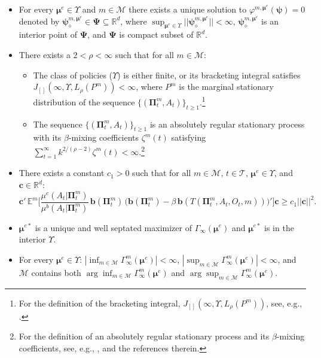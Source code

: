 \documentclass[opre,nonblindrev]{informs2}%
\newcommand{\1}{\hbox{\rm 1\kern-.35em 1}}
\newcommand{\E}{\mathbb E}
\newcommand{\MT}{\mathscr T}
\newcommand{\MM}{\mathscr M}
\newcommand{\bPi}{\boldsymbol{\Pi}}
\newcommand{\bmu}{\boldsymbol{\mu}}
\newcommand{\bpsi}{\boldsymbol{\psi}}
\newcommand{\bPsi}{\boldsymbol{\Psi}}
\newcommand{\bb}{\mathbf{b}}
\begin{document}
\begin{itemize}[leftmargin=1cm,align=left]
\item[(C1)]  For every $\bmu^e\in\Upsilon$ and $m\in\MM$ there exists a unique solution to $\varphi^{m,\bmu^e} (\bpsi)=0$ denoted by $\bpsi_\diamond^{m,\bmu^e}\in\bPsi\subseteq \mathbb R^d$, where $\sup_{\bmu^e\in\Upsilon}||\bpsi_\diamond^{m,\bmu^e}||<\infty$,  $\bpsi_\diamond^{m,\bmu^e}$  is an interior point of $\bPsi$, and $\bPsi$ is compact subset of $\mathbb R^d$.
\item[(C2)]  There exists a  $2<\rho<\infty$ such that for all $m\in\MM$:
\begin{itemize}[leftmargin=1.5cm]
\item[(C2a)] The class of policies ($\Upsilon$) is either finite, or its bracketing integral satisfies  $J_{[]}(\infty,\Upsilon, L_\rho(P^m))<\infty$, where $P^m$ is  the marginal stationary distribution of the sequence $\{(\bPi^m_t, A_t)\}_{t\geq 1}$.\footnote{For the definition of the bracketing integral, $J_{[]}(\infty,\Upsilon, L_\rho(P^m))$, see, e.g., \cite{Kosorok2008}.}
\item[(C2b)] The sequence $\{(\bPi^m_t, A_t)\}_{t\geq 1}$  is an absolutely regular stationary process with its $\beta$-mixing coefficients $\zeta^m (t)$ satisfying $\sum_{t=1}^{\infty} k^{2/(\rho-2)} \zeta^m (t)<\infty$.\footnote{For the definition of  an absolutely regular stationary process and its $\beta$-mixing coefficients, see, e.g., \cite{Dedecker2002, Kosorok2008}, and the references therein.}
\end{itemize}
\noindent\item[(C3)] There exists a constant $c_1>0$ such that for all $m\in\MM$, $t\in\MT$, $\bmu^e\in\Upsilon$, and  $\mathbf{c}\in\mathbb R^d$:
\begin{equation}
\mathbf{c}'\,\E^{m} \Bigg[\frac{\mu^e(A_t|\bPi^m_t)}{\mu^b(A_t|\bPi^m_t)}\, \bb(\bPi_t^m)\, \Big(\bb(\bPi_t^m)-\beta\, \bb(T(\bPi^m_t, A_t, O_t, m))\Big)'\Bigg]
 \mathbf{c}\geq c_1 ||\mathbf{c}||^2.
\end{equation}
\noindent\item[(C4)] $\bmu^{e*}$ is a unique and well septated maximizer of $\Gamma_\infty(\bmu^{e})$ and $\bmu^{e*}$ is in the interior $\Upsilon$.
\noindent\item[(C5)] For every $\bmu^e\in\Upsilon$: $|\inf_{m\in\MM} \Gamma^m_{\infty} (\bmu^e)|<\infty$, $|\sup_{m\in\MM} \Gamma^m_{\infty} (\bmu^e)|<\infty$, and  $\MM$ contains both $\arg\!\inf_{m\in\MM} \Gamma^m_{\infty} (\bmu^e)$ and $\arg\!\sup_{m\in\MM} \Gamma^m_{\infty} (\bmu^e).$
\end{itemize}
\end{document}
